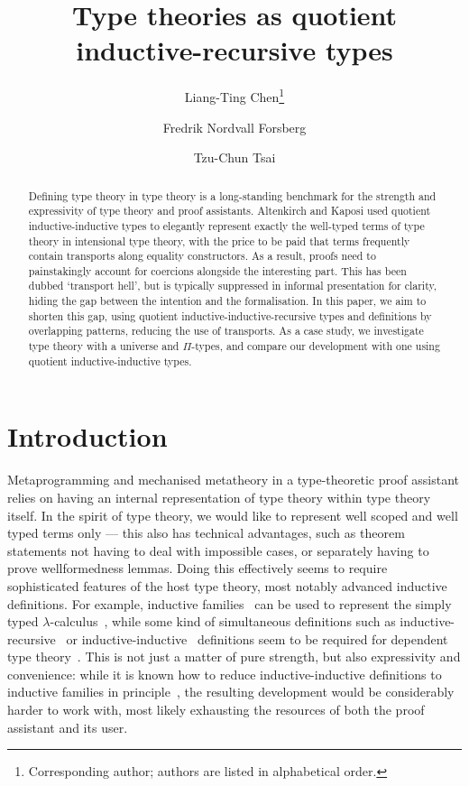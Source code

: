 \documentclass[a4paper,UKenglish,numberwithinsect,cleveref,thm-restate]{lipics-v2021}
\title{Type theories as quotient inductive-recursive types}
\author{Liang-Ting Chen\footnote{Corresponding author; authors are listed in alphabetical order.}}{Institute of Information Science, Academia Sinica, Taiwan \and \url{http://l-tchen.github.io}}{ltchen@iis.sinica.edu.tw}{https://orcid.org/0000-0002-3250-1331}{The National Science and Technology Council of Taiwan under grant NSTC 114-2222-E-001-001-MY3.}
\author{Fredrik Nordvall Forsberg}{Department of Computer and Information Sciences, University of Strathclyde, UK \and \url{https://fredriknf.com}}{fredrik.nordvall-forsberg@strath.ac.uk}{https://orcid.org/0000-0001-6157-9288}{The Engineering and Physical Sciences Research Council [EP/Y000455/1].}
\author{Tzu-Chun Tsai}{Institute of Information Science, Academia Sinica, Taiwan}{gene0905@icloud.com}{}{The National Science and Technology Council of Taiwan under grant NSTC 112-2221-E-001-003-MY3.}
\begin{document}
\maketitle

\begin{abstract}
  Defining type theory in type theory is a long-standing benchmark for the strength and expressivity of type theory and proof assistants.
  Altenkirch and Kaposi used quotient inductive-inductive types to elegantly represent exactly the well-typed terms of type theory in intensional type theory, with the price to be paid that terms frequently contain transports along equality constructors.
  As a result, proofs need to painstakingly account for coercions alongside the interesting part.
  This %
  has been dubbed `transport hell', but is typically suppressed in informal presentation for clarity, hiding the gap between the intention and the formalisation.
  In this paper, we aim to shorten this gap, using quotient inductive-inductive-recursive types and definitions by overlapping patterns, reducing the use of transports.
  As a case study, we investigate type theory with a universe and $\Pi$-types, and compare our development with one using quotient inductive-inductive types.
\end{abstract}

\section{Introduction} \label{sec:intro}

Metaprogramming and mechanised metatheory in a type-theoretic proof assistant relies on having an internal representation of type theory within type theory itself.
%
In the spirit of type theory, we would like to represent well scoped and well typed terms only --- this also has technical advantages, such as theorem statements not having to deal with impossible cases, or separately having to prove wellformedness lemmas.
%
Doing this effectively seems to require sophisticated features of the host type theory, most notably advanced inductive definitions.
%
For example, inductive families~\cite{Dybjer1994} can be used to represent the simply typed $\lambda$-calculus~\cite{Altenkirch1999}, while some kind of simultaneous definitions such as inductive-recursive~\cite{Dybjer2000} or inductive-inductive~\cite{Nordvall-Forsberg2014} definitions seem to be required for dependent type theory~\cite{Danielsson2006,Chapman2009}.
%
This is not just a matter of pure strength, but also expressivity and convenience: while it is known how to reduce inductive-inductive definitions to inductive families in principle~\cite{Kaposi2020a}, the resulting development would be considerably harder to work with, most likely exhausting the resources of both the proof assistant and its user.
\end{document}
